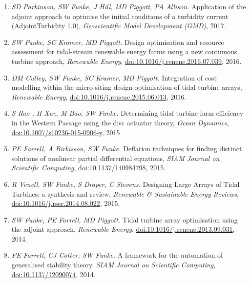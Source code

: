 \documentclass[11pt]{article}
\begin{document}
\newpage
{}
\begin{enumerate}
    \item \textit{SD Parkinson, SW Funke, J Hill, MD Piggott, PA Allison.} Application of the adjoint approach to optimise the initial conditions of a turbidity current (AdjointTurbidity 1.0), \textit{Geoscientific Model Development (GMD)}, 2017.
    \item \textit{SW Funke, SC Kramer, MD Piggott.} Design optimisation and resource assessment for tidal-stream renewable energy farms using a new continuous turbine approach, \textit{Renewable Energy}, \href{https://dx.doi.org/10.1016/j.renene.2016.07.039}{doi:10.1016/j.renene.2016.07.039}, 2016.
    \item \textit{DM Culley, SW Funke, SC Kramer, MD Piggott.} Integration of cost modelling within the micro-siting design optimisation of tidal turbine arrays, \textit{Renewable Energy}, \href{https://doi.org/10.1016/j.renene.2015.06.013}{doi:10.1016/j.renene.2015.06.013}, 2016.
    \item \textit{S Rao , H Xue, M Bao, SW Funke.} Determining tidal turbine farm efficiency in the Western Passage using the disc actuator theory, \textit{Ocean Dynamics}, \href{https://doi.org/10.1007/s10236-015-0906-y}{doi:10.1007/s10236-015-0906-y}, 2015
\item \textit{PE Farrell, A Birkisson, SW Funke.} Deflation techniques for finding distinct solutions of nonlinear partial differential equations, \textit{SIAM Journal on Scientific Computing}, \href{https://doi.org/10.1137/140984798}{doi:10.1137/140984798}, 2015.
\item \textit{R Venell, SW Funke, S Draper, C Stevens.} Designing Large Arrays of Tidal Turbines: a synthesis and review, \textit{Renewable \& Sustainable Energy Reviews}, \href{https://doi.org/10.1016/j.rser.2014.08.022}{doi:10.1016/j.rser.2014.08.022}, 2015.
\item \textit{SW Funke, PE Farrell, MD Piggott.} Tidal turbine array optimisation using the adjoint approach, \textit{Renewable Energy}, \href{https://doi.org/10.1016/j.renene.2013.09.031}{doi:10.1016/j.renene.2013.09.031}, 2014.
\item \textit{PE Farrell, CJ Cotter, SW Funke.} A framework for the automation of generalised stability theory. \textit{SIAM Journal on     Scientific Computing}, \href{https://doi.org/10.1016/10.1137/12090074}{doi:10.1137/12090074}, 2014.

\end{enumerate}
\end{document}
